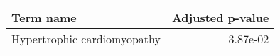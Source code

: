 \begin{tabular}{lr}
\toprule
                  Term name &  Adjusted p-value \\
\midrule
Hypertrophic cardiomyopathy &          3.87e-02 \\
\bottomrule
\end{tabular}
